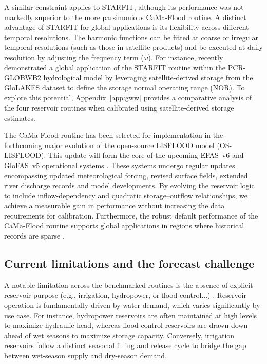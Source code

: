 \documentclass[hess, manuscript]{copernicus}
\begin{document}
A similar constraint applies to STARFIT, although its performance was not markedly superior to the more parsimonious CaMa-Flood routine. A distinct advantage of STARFIT for global applications is its flexibility across different temporal resolutions. The harmonic functions can be fitted at coarse or irregular temporal resolutions (such as those in satellite products) and be executed at daily resolution by adjusting the frequency term ($\omega$). For instance, \citet{Steyaert2025} recently demonstrated a global application of the STARFIT routine within the PCR-GLOBWB2 hydrological model by leveraging satellite-derived storage from the GloLAKES dataset \citep{Hou2024} to define the storage normal operating range (NOR). To explore this potential, Appendix~\ref{app:gww} provides a comparative analysis of the four reservoir routines when calibrated using satellite-derived storage estimates.

The CaMa-Flood routine has been selected for implementation in the forthcoming major evolution of the open-source LISFLOOD model (OS-LISFLOOD). This update will form the core of the upcoming EFAS~v6 and GloFAS~v5 operational systems \citep{Salamon2025}. These systems undergo regular updates encompassing updated meteorological forcing, revised surface fields, extended river discharge records and model developments. By evolving the reservoir logic to include inflow-dependency and quadratic storage--outflow relationships, we achieve a measurable gain in performance without increasing the data requirements for calibration. Furthermore, the robust default performance of the CaMa-Flood routine supports global applications in regions where historical records are sparse \citep{Hanazaki2022}.

\subsection{Current limitations and the forecast challenge}
\label{sec:limitations}

A notable limitation across the benchmarked routines is the absence of explicit reservoir purpose (e.g., irrigation, hydropower, or flood control...) \citep{Shen2025}. Reservoir operation is fundamentally driven by water demand, which varies significantly by use case. For instance, hydropower reservoirs are often maintained at high levels to maximize hydraulic head, whereas flood control reservoirs are drawn down ahead of wet seasons to maximize storage capacity. Conversely, irrigation reservoirs follow a distinct seasonal filling and release cycle to bridge the gap between wet-season supply and dry-season demand. 
\end{document}
